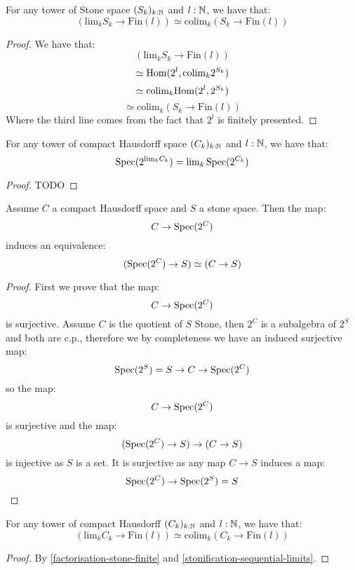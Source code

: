 \begin{lemma}\label{factorisation-stone-finite}
For any tower of Stone space $(S_k)_{k:\mathbb{N}}$ and $l:\mathbb{N}$, we have that:
\[\left(\mathrm{lim}_kS_k\to \mathrm{Fin}(l)\right) \simeq \mathrm{colim}_k (S_k\to \mathrm{Fin}(l))\]
\end{lemma}

\begin{proof}
We have that:
\[\left(\mathrm{lim}_kS_k\to \mathrm{Fin}(l)\right) \]
\[\simeq \mathrm{Hom}(2^l, \mathrm{colim}_k 2^{S_k})\]
\[\simeq \mathrm{colim}_k \mathrm{Hom}(2^l, 2^{S_k}) \]
\[\simeq \mathrm{colim}_k (S_k\to \mathrm{Fin}(l))\]
Where the third line comes from the fact that $2^l$ is finitely presented.
\end{proof}

\begin{lemma}\label{stonification-sequential-limits}
For any tower of compact Hausdorff space $(C_k)_{k:\mathbb{N}}$ and $l:\mathbb{N}$, we have that:
\[\operatorname{Spec}(2^{\mathrm{lim}_k C_k}) = \mathrm{lim}_k\operatorname{Spec}(2^{C_k})\]
\end{lemma}

\begin{proof}
TODO
\end{proof}

\begin{lemma}
Assume $C$ a compact Hausdorff space and $S$ a stone space. Then the map:
\[C\to \operatorname{Spec}(2^C)\]
induces an equivalence:
\[(\operatorname{Spec}(2^C) \to S) \simeq(C\to S) \]
\end{lemma}

\begin{proof}
First we prove that the map:
\[C\to \operatorname{Spec}(2^C)\]
is surjective. Assume $C$ is the quotient of $S$ Stone, then $2^C$ is a subalgebra of $2^S$ and both are c.p., therefore we by completeness we have an induced surjective map:
\[\operatorname{Spec}(2^S) = S\to C\to \operatorname{Spec}(2^C)\]
so the map:
\[C\to \operatorname{Spec}(2^C)\]
is surjective and the map:
\[(\operatorname{Spec}(2^C) \to S) \to (C\to S) \]
is injective as $S$ is a set. It is surjective as any map $C\to S$ induces a map:
\[\operatorname{Spec}(2^C) \to \operatorname{Spec}(2^S) = S\]
\end{proof}

\begin{lemma}\label{factorisation-compact-hausdorff-finite}
For any tower of compact Hausdorff $(C_k)_{k:\mathbb{N}}$ and $l:\mathbb{N}$, we have that:
\[\left(\mathrm{lim}_kC_k\to \mathrm{Fin}(l)\right) \simeq \mathrm{colim}_k (C_k\to \mathrm{Fin}(l))\]
\end{lemma}

\begin{proof}
By \cref{factorisation-stone-finite} and \cref{stonification-sequential-limits}.
\end{proof}

